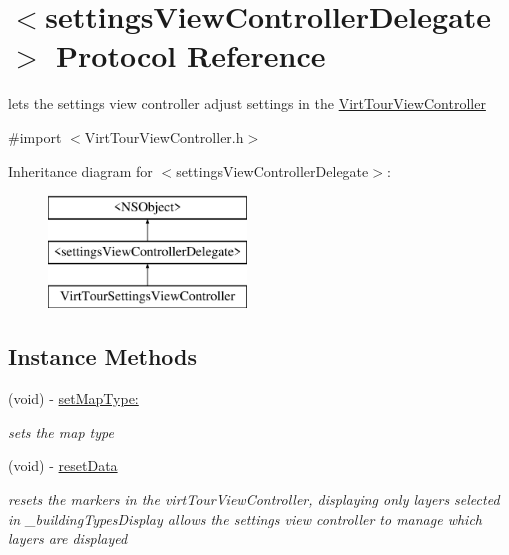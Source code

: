 \hypertarget{protocolsettings_view_controller_delegate-p}{\section{$<$settings\-View\-Controller\-Delegate$>$ Protocol Reference}
\label{protocolsettings_view_controller_delegate-p}
}


lets the settings view controller adjust settings in the \hyperlink{interface_virt_tour_view_controller}{Virt\-Tour\-View\-Controller}  




{\ttfamily \#import $<$Virt\-Tour\-View\-Controller.\-h$>$}

Inheritance diagram for $<$settings\-View\-Controller\-Delegate$>$\-:\begin{figure}[H]
\begin{center}
\leavevmode
\includegraphics[height=3.000000cm]{protocolsettings_view_controller_delegate-p}
\end{center}
\end{figure}
\subsection*{Instance Methods}
\begin{DoxyCompactItemize}
\item 
\hypertarget{protocolsettings_view_controller_delegate-p_ad077ea4c02d3acf879ee0d42442813c4}{(void) -\/ \hyperlink{protocolsettings_view_controller_delegate-p_ad077ea4c02d3acf879ee0d42442813c4}{set\-Map\-Type\-:}}\label{protocolsettings_view_controller_delegate-p_ad077ea4c02d3acf879ee0d42442813c4}

\begin{DoxyCompactList}\small\item\em sets the map type \end{DoxyCompactList}\item 
\hypertarget{protocolsettings_view_controller_delegate-p_ab51301d11ddc80165b3b7798b866421e}{(void) -\/ \hyperlink{protocolsettings_view_controller_delegate-p_ab51301d11ddc80165b3b7798b866421e}{reset\-Data}}\label{protocolsettings_view_controller_delegate-p_ab51301d11ddc80165b3b7798b866421e}

\begin{DoxyCompactList}\small\item\em resets the markers in the virt\-Tour\-View\-Controller, displaying only layers selected in \-\_\-building\-Types\-Display  allows the settings view controller to manage which layers are displayed \end{DoxyCompactList}\end{DoxyCompactItemize}


